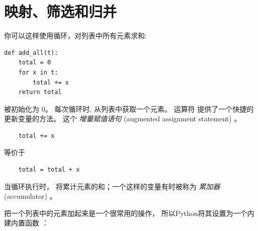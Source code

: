 \section{映射、筛选和归并}
\label{filter}


你可以这样使用循环，对列表中所有元素求和:


\begin{lstlisting}
def add_all(t):
    total = 0
    for x in t:
        total += x
    return total
\end{lstlisting}
%

 被初始化为 0。 每次循环时,  从列表中获取一个元素。
运算符 \li{+=} 提供了一个快捷的更新变量的方法。 这个 {\em 增量赋值语句} (augmented assignment statement) 。

  
  

\begin{lstlisting}
    total += x
\end{lstlisting}

%

等价于

\begin{lstlisting}
    total = total + x
\end{lstlisting}

%

当循环执行时， 将累计元素的和；一个这样的变量有时被称为 {\em 累加器} (accumulator) 。



把一个列表中的元素加起来是一个很常用的操作，
所以Python将其设置为一个内建内置函数  ：

